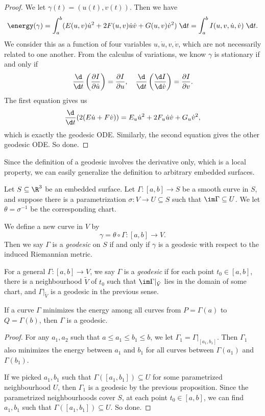 \documentclass[a4paper]{article}
\begin{document}
\begin{proof}
  We let $\gamma(t) = (u(t), v(t))$. Then we have
  \[
    \energy (\gamma) = \int_a^b (E(u, v) \dot{u}^2 + 2F(u, v) \dot{u}\dot{v} + G(u, v) \dot{v}^2) \;\d t = \int_a^b I(u, v, \dot{u}, \dot{v}) \;\d t.
  \]
  We consider this as a function of four variables $u, \dot{u}, v, \dot{v}$, which are not necessarily related to one another. From the calculus of variations, we know $\gamma$ is stationary if and only if
  \[
    \frac{\d}{\d t} \left(\frac{\partial I}{\partial \dot{u}}\right) = \frac{\partial I}{\partial u},\quad \frac{\d}{\d t} \left(\frac{\d I}{\d \dot{v}}\right) = \frac{\partial I}{\partial v}.
  \]
  The first equation gives us
  \[
    \frac{\d}{\d t} (2 (E\dot{u} + F\dot{v})) = E_u \dot{u}^2 + 2F_u\dot{u}\dot{v} + G_u\dot{v}^2,
  \]
  which is exactly the geodesic ODE. Similarly, the second equation gives the other geodesic ODE. So done.
\end{proof}

Since the definition of a geodesic involves the derivative only, which is a local property, we can easily generalize the definition to arbitrary embedded surfaces.

\begin{defi}
  Let $S \subseteq \R^3$ be an embedded surface. Let $\Gamma: [a, b] \to S$ be a smooth curve in $S$, and suppose there is a parametrization $\sigma: V \to U \subseteq S$ such that $\im \Gamma \subseteq U$. We let $\theta = \sigma^{-1}$ be the corresponding chart.

  We define a new curve in $V$ by
  \[
    \gamma = \theta \circ \Gamma : [a, b] \to V.
  \]
  Then we say $\Gamma$ is a \emph{geodesic} on $S$ if and only if $\gamma$ is a geodesic with respect to the induced Riemannian metric.

  For a general $\Gamma: [a, b] \to V$, we say $\Gamma$ is a \emph{geodesic} if for each point $t_0 \in [a, b]$, there is a neighbourhood $\tilde{V}$ of $t_0$ such that $\im \Gamma|_{\tilde{V}}$ lies in the domain of some chart, and $\Gamma|_{\tilde{V}}$ is a geodesic in the previous sense.
\end{defi}

\begin{cor}
  If a curve $\Gamma$ minimizes the energy among all curves from $P = \Gamma(a)$ to $Q = \Gamma(b)$, then $\Gamma$ is a geodesic.
\end{cor}

\begin{proof}
  For any $a_1, a_2$ such that $a \leq a_1 \leq b_1 \leq b$, we let $\Gamma_1 = \Gamma|_{[a_1, b_1]}$. Then $\Gamma_1$ also minimizes the energy between $a_1$ and $b_1$ for all curves between $\Gamma(a_1)$ and $\Gamma(b_1)$.

  If we picked $a_1, b_1$ such that $\Gamma([a_1, b_1]) \subseteq U$ for some parametrized neighbourhood $U$, then $\Gamma_1$ is a geodesic by the previous proposition. Since the parametrized neighbourhoods cover $S$, at each point $t_0 \in [a, b]$, we can find $a_1, b_1$ such that $\Gamma([a_1, b_1]) \subseteq U$. So done.
\end{proof}
\end{document}
